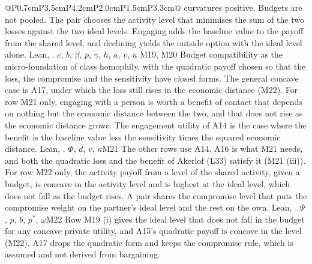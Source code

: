 \begin{longtable}{@{}P{0.7cm}P{3.5cm}P{4.2cm}P{2.0cm}P{1.5cm}P{3.3cm}@{}}
{  curvatures positive. Budgets are not pooled. The pair chooses the
  activity level that minimises the sum of the two losses against the two
  ideal levels. Engaging adds the baseline value to the payoff from the
  shared level, and declining yields the outside option with the ideal
  level alone. Lean, .}
  {$c$, $b$, $\beta$, $p$, $\gamma$, $h$, $a$, $v$, $\bar u$}
  {M19, M20}
  {Budget compatibility as the micro-foundation of class homophily, with
  the quadratic payoff chosen so that the loss, the compromise and the
  sensitivity have closed forms. The general concave case is A17, under
  which the loss still rises in the economic distance (M22).}
  {For row M21 only, engaging with a person is worth a benefit of contact
  that depends on nothing but the economic distance between the two, and that
  does not rise as the economic distance grows. The engagement utility of A14
  is the case where the benefit is the baseline value less the sensitivity
  times the squared economic distance.
  Lean, .}
  {$\Phi$, $d$, $v$, $\kappa$}{M21}
  {The other
  rows use A14. A16 is what M21 needs, and both the quadratic loss and the
  benefit of Akerlof (L33) satisfy it (M21 (iii)).}
  {For row M22 only, the activity payoff from a level of the shared
  activity, given a budget, is concave in the activity level and is highest
  at the ideal level, which does not fall as the budget rises. A pair shares
  the compromise level that puts the compromise weight on the partner's
  ideal level and the rest on the own. Lean,
  .}
  {$\Psi$, $p$, $b$, $p^*$, $\omega$}{M22}
  {Row M19 (i) gives the ideal level that does not fall in the budget for
  any concave private utility, and A15's quadratic payoff is concave in the
  level (M22). A17 drops the quadratic form and keeps the compromise rule,
  which is assumed and not derived from bargaining.}
\end{longtable}
\normalsize

